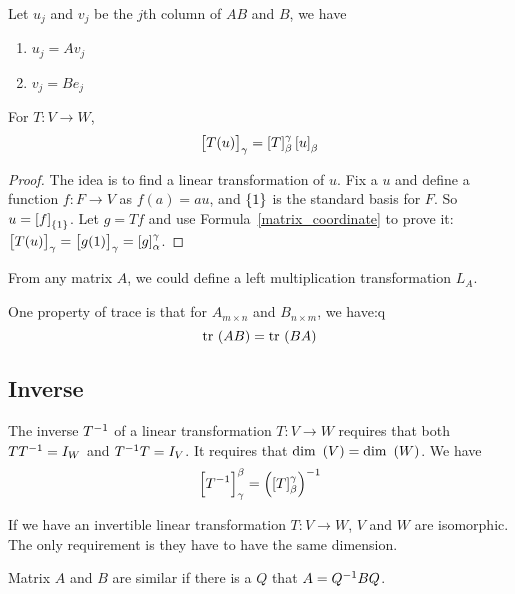 Let $u_j$ and $v_j$ be the $j$th column of $AB$ and $B$, we have
\begin{enumerate}
    \item $u_j = A v_j$
    \item $v_j = B e_j$
\end{enumerate}

\begin{theorem}
    For $T: V \rightarrow W$,
    \begin{equation}
        \coordinate{T(u)}_\gamma = \coordinate{T}_{\beta}^{\gamma} \coordinate{u}_{\beta}
    \end{equation}    
\end{theorem}
\begin{proof}
    The idea is to find a linear transformation of $u$. Fix a $u$ and define a function $f: F \rightarrow V$ as $f(a) = au$, and $\set{1}$ is the standard basis for $F$. So $u = \coordinate{f}_{\set{1}}$. Let $g=Tf$ and use Formula~\ref{matrix_coordinate} to prove it: $\coordinate{T(u)}_\gamma = \coordinate{g(1)}_\gamma = \coordinate{g}_{\alpha}^{\gamma}$.
\end{proof}

From any matrix $A$, we could define a left multiplication transformation $L_A$.

One property of trace is that for $A_{m \times n}$ and $B_{n \times m}$, we have:q
\begin{equation}
    \displaystyle \mathrm{tr}~( AB ) = \displaystyle \mathrm{tr}~( BA )
\end{equation}

\subsection{Inverse}
The inverse ${T}^{-1}$ of a linear transformation $T:V \rightarrow W$ requires that both $T {T}^{-1} = I_W$ and ${T}^{-1} T = I_V$. It requires that $\displaystyle \mathrm{dim}~\left( V \right) = \displaystyle \mathrm{dim}~\left( W \right)$. We have
\begin{equation}
    \coordinate{\inverse{T}}_{\gamma}^{\beta} = \inverse{\left( \coordinate{T}_{\beta}^{\gamma} \right)}
\end{equation}

If we have an invertible linear transformation $T:V \rightarrow W$, $V$ and $W$ are isomorphic. The only requirement is they have to have the same dimension.

Matrix $A$ and $B$ are similar if there is a $Q$ that $A = {Q}^{-1} B Q$.



